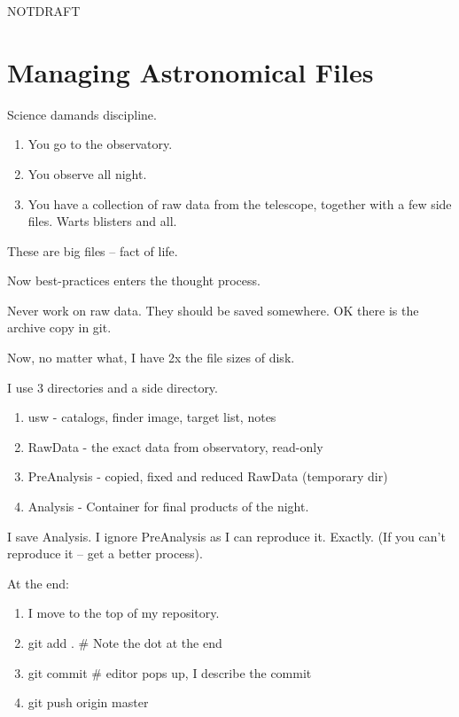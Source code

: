 \documentclass[letter,11pt,oneside]{article}
\def\documentisdraft{NOTDRAFT}
\begin{document}

\setcounter{section}{0}

\ifx\documentisdraft\drafttest
\linenumbers    %
\fi


\section{Managing Astronomical Files}

Science damands discipline.

\vspace{-.15cm}
\begin{enumerate}\addtolength{\itemsep}{-0.5\baselineskip}
   \item  You go to the observatory.
   \item  You observe all night.
   \item  You have a collection of raw data from the telescope, together with
a few side files.  Warts blisters and all.

\end{enumerate}

These are big files -- fact of life.

Now best-practices enters the thought process.

Never work on raw data. They should be saved somewhere.
OK there is the archive copy in git.

Now, no matter what, I have 2x the file sizes of disk.

I use 3 directories and a side directory.

\vspace{-.15cm}
\begin{enumerate}\addtolength{\itemsep}{-0.5\baselineskip}
   \item   usw - catalogs, finder image, target list, notes
   \item   RawData - the exact data from observatory, read-only
   \item   PreAnalysis - copied, fixed and reduced RawData (temporary dir)
   \item   Analysis - Container for final products of the night.
\end{enumerate}


I save Analysis. I ignore PreAnalysis as I can reproduce it.
Exactly. (If you can't reproduce it -- get a better process).

At the end:

\vspace{-.15cm}
\begin{enumerate}\addtolength{\itemsep}{-0.5\baselineskip}
   \item   I move to the top of my repository.
   \item   git add . \# Note the dot at the end
   \item   git commit \# editor pops up, I describe the commit
   \item   git push origin master
\end{enumerate}
\end{document}
